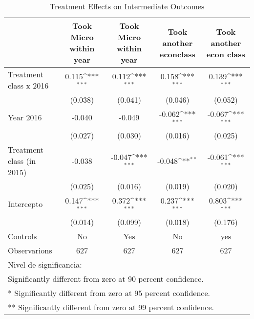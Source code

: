 \begin{table}[]
\caption{Treatment Effects on Intermediate Outcomes}
{
\def\sym#1{\ifmmode^{#1}\else\(^{#1}\)\fi}
\begin{tabular}{@{\extracolsep{2pt}}l*{4}{c}@{}}
\hline\hline


 & Took Micro within year & Took Micro within year & Took another econclass & Took another econ class \\
\hline
Treatment class x 2016 & 0.115\sym{***} & 0.112\sym{***} & 0.158\sym{***} & 0.139\sym{***} \\
 & (0.038) & (0.041) & (0.046) & (0.052) \\
Year 2016 & -0.040 & -0.049 & -0.062\sym{***} & -0.067\sym{***} \\
 & (0.027) & (0.030) & (0.016) & (0.025) \\
Treatment class (in 2015) & -0.038 & -0.047\sym{***} & -0.048\sym{**} & -0.061\sym{***} \\
 & (0.025) & (0.016) & (0.019) & (0.020) \\
Intercepto & 0.147\sym{***} & 0.372\sym{***} & 0.237\sym{***} & 0.803\sym{***} \\
 & (0.014) & (0.099) & (0.018) & (0.176) \\
Controls & No & Yes & No & yes \\

\hline
Observarions & 627 & 627 & 627 & 627 \\
\hline\hline
\multicolumn{5}{l}{\footnotesize Nivel de significancia:}\vspace{-.25em} \\
\multicolumn{5}{l}{\footnotesize * Significantly different from zero at 90 percent confidence.}\vspace{-.25em} \\
\multicolumn{5}{l}{\footnotesize ** Significantly different from zero at 95 percent confidence.}\vspace{-.25em} \\
\multicolumn{5}{l}{\footnotesize *** Significantly different from zero at 99 percent confidence.}
\end{tabular}
}
\end{table}